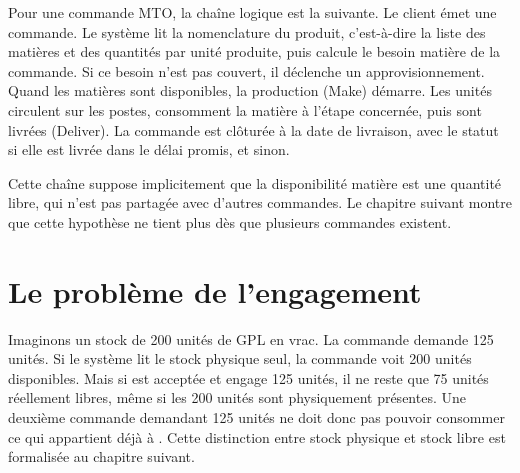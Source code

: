 Pour une commande MTO, la chaîne logique est la suivante. Le client émet une commande. Le
système lit la nomenclature du produit, c'est-à-dire la liste des matières et des quantités
par unité produite, puis calcule le besoin matière de la commande. Si ce besoin n'est pas
couvert, il déclenche un approvisionnement. Quand les matières sont disponibles, la
production (Make) démarre. Les unités circulent sur les postes, consomment la matière à
l'étape concernée, puis sont livrées (Deliver). La commande est clôturée à la date de
livraison, avec le statut  si elle est livrée dans le délai promis, et
 sinon.

Cette chaîne suppose implicitement que la disponibilité matière est une quantité libre,
qui n'est pas partagée avec d'autres commandes. Le chapitre suivant montre que cette
hypothèse ne tient plus dès que plusieurs commandes existent.

\section{Le problème de l'engagement}

Imaginons un stock de 200 unités de GPL en vrac. La commande  demande 125 unités.
Si le système lit le stock physique seul, la commande voit 200 unités disponibles. Mais si
 est acceptée et engage 125 unités, il ne reste que 75 unités réellement libres,
même si les 200 unités sont physiquement présentes. Une deuxième commande demandant 125
unités ne doit donc pas pouvoir consommer ce qui appartient déjà à . Cette
distinction entre stock physique et stock libre est formalisée au chapitre suivant.
